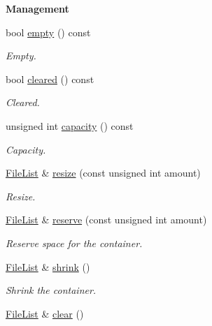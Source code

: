 \begin{Indent}{\bf Management}\par
\begin{DoxyCompactItemize}
\item 
bool \hyperlink{exceptionmagrathea_1_1FileList_a2252143ee3dc5bf6c5d3559c0170f9f6}{empty} () const 
\begin{DoxyCompactList}\small\item\em Empty. \end{DoxyCompactList}\item 
bool \hyperlink{exceptionmagrathea_1_1FileList_a9ad9c5f5f7129b7ad2df7e7464ef8eb7}{cleared} () const 
\begin{DoxyCompactList}\small\item\em Cleared. \end{DoxyCompactList}\item 
unsigned int \hyperlink{exceptionmagrathea_1_1FileList_aa798f0615743b3582534de6946d96e60}{capacity} () const 
\begin{DoxyCompactList}\small\item\em Capacity. \end{DoxyCompactList}\item 
\hyperlink{exceptionmagrathea_1_1FileList}{File\-List} \& \hyperlink{exceptionmagrathea_1_1FileList_a6626f610662eb22c1fc4a5a831d2e027}{resize} (const unsigned int amount)
\begin{DoxyCompactList}\small\item\em Resize. \end{DoxyCompactList}\item 
\hyperlink{exceptionmagrathea_1_1FileList}{File\-List} \& \hyperlink{exceptionmagrathea_1_1FileList_a6ecbff3a46caed2a057da82f2236e54d}{reserve} (const unsigned int amount)
\begin{DoxyCompactList}\small\item\em Reserve space for the container. \end{DoxyCompactList}\item 
\hyperlink{exceptionmagrathea_1_1FileList}{File\-List} \& \hyperlink{exceptionmagrathea_1_1FileList_a9e7fe8d4825a57fdc36a31b50c6c1792}{shrink} ()
\begin{DoxyCompactList}\small\item\em Shrink the container. \end{DoxyCompactList}\item 
\hyperlink{exceptionmagrathea_1_1FileList}{File\-List} \& \hyperlink{exceptionmagrathea_1_1FileList_ac1a9fc96a04bf54baea5bd0c852d0318}{clear} ()

\end{DoxyCompactItemize}
\end{Indent}
